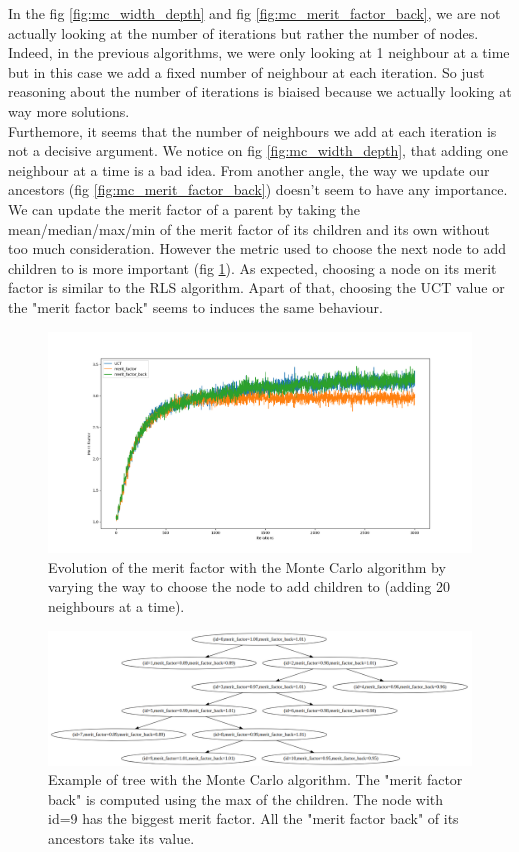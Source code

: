 \documentclass[a4paper,11pt,openany]{article}
\begin{document}
\noindent
In the fig \ref{fig:mc_width_depth} and fig \ref{fig:mc_merit_factor_back}, we are not actually looking at the number of iterations but rather the number of nodes. Indeed, in the previous algorithms, we were only looking at 1 neighbour at a time but in this case we add a fixed number of neighbour at each iteration. So just reasoning about the number of iterations is biaised because we actually looking at way more solutions.\\
Furthemore, it seems that the number of neighbours we add at each iteration is not a decisive argument. We notice on fig \ref{fig:mc_width_depth}, that adding one neighbour at a time is a bad idea. From another angle, the way we update our ancestors (fig \ref{fig:mc_merit_factor_back}) doesn't seem to have any importance. We can update the merit factor of a parent by taking the mean/median/max/min of the merit factor of its children and its own without too much consideration. However the metric used to choose the next node to add children to is more important (fig \ref{fig:mc_choose_children}). As expected, choosing a node on its merit factor is similar to the RLS algorithm. Apart of that, choosing the UCT value or the "merit factor back" seems to induces the same behaviour.
\begin{figure}[H]
\begin{center}
\includegraphics[scale=0.22]{Images/mc_choose_children}
\caption{Evolution of the merit factor with the Monte Carlo algorithm by varying the way to choose the node to add children to (adding 20 neighbours at a time).}
\label{fig:mc_choose_children}
\end{center}
\end{figure}
\begin{figure}[H]
\begin{center}
\includegraphics[scale=0.3]{Images/mc_tree}
\caption{Example of tree with the Monte Carlo algorithm. The "merit factor back" is computed using the max of the children. The node with id=9 has the biggest merit factor. All the "merit factor back" of its ancestors take its value.}
\label{fig:mc_tree}
\end{center}
\end{figure}
\end{document}

